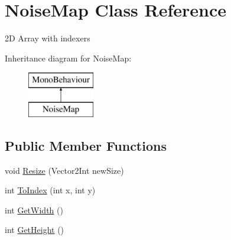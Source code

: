 \hypertarget{class_noise_map}{}\section{Noise\+Map Class Reference}
\label{class_noise_map}


2D Array with indexers  


Inheritance diagram for Noise\+Map\+:\begin{figure}[H]
\begin{center}
\leavevmode
\includegraphics[height=2.000000cm]{class_noise_map}
\end{center}
\end{figure}
\subsection*{Public Member Functions}
\begin{DoxyCompactItemize}
\item 
void \mbox{\hyperlink{class_noise_map_a202d577f21b8d8264ffe78cea2149cb8}{Resize}} (Vector2\+Int new\+Size)
\item 
int \mbox{\hyperlink{class_noise_map_a833fc31b1d8e9792634f22e74f099625}{To\+Index}} (int x, int y)
\item 
int \mbox{\hyperlink{class_noise_map_af3cba5e8724a9234b800836ed242e9aa}{Get\+Width}} ()
\item 
int \mbox{\hyperlink{class_noise_map_a786377605734c7aec5c73905e0099780}{Get\+Height}} ()
\end{DoxyCompactItemize}
